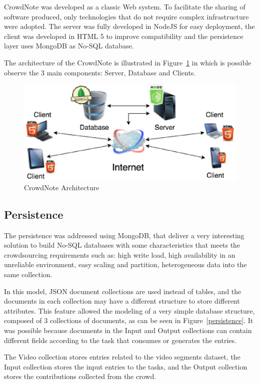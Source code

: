 CrowdNote was developed as a classic Web system. To facilitate the sharing of software produced, only technologies that do not require complex infrastructure were adopted. The server was fully developed in NodeJS for easy deployment, the client was developed in HTML 5 to improve compatibility and the persistence layer uses MongoDB as No-SQL database.

The architecture of the CrowdNote is illustrated in Figure~\ref{architecture} in which is possible observe the 3 main components: Server, Database and Clients.

\begin{figure}[h!]
	\centerline{\includegraphics[scale=0.3] {figure/Architecture}}
	\caption{CrowdNote Architecture}
	\label{architecture}
\end{figure}

\subsection{Persistence}
The persistence was addressed using MongoDB, that deliver a very interesting solution to build No-SQL databases with some characteristics that meets the crowdsourcing requirements such as: high write load, high availability in an unreliable environment,  easy scaling and partition, heterogeneous data into the same collection.

In this model, JSON document collections are used instead of tables, and the documents in each collection may have a different structure to store different attributes. This feature allowed the modeling of a very simple database structure, composed of 3 collections of documents, as can be seen in Figure~\ref{persistence}. It was possible because documents in the Input and Output collections can contain different fields according to the task that consumes or generates the entries.

The Video collection stores entries related to the video segments dataset, the Input collection stores the input entries to the tasks, and the Output collection stores the contributions collected from the crowd.

